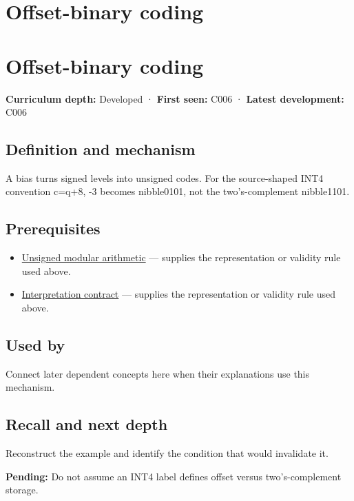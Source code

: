 \hypertarget{appendix-53a8cfb25f8d}{}
\section*{Offset-binary coding}
\section{Offset-binary coding}\label{offset-binary-coding}

\textbf{Curriculum depth:} Developed · \textbf{First seen:} C006 · \textbf{Latest development:} C006

\subsection{Definition and mechanism}\label{definition-and-mechanism}

A bias turns signed levels into unsigned codes. For the source-shaped INT4 convention c=q+8, -3 becomes nibble0101, not the two's-complement nibble1101.

\subsection{Prerequisites}\label{prerequisites}

\begin{itemize}
\tightlist
\item
  \hyperref[appendix-c99977d88b33]{Unsigned modular arithmetic} --- supplies the representation or validity rule used above.
\item
  \hyperref[appendix-f414bd4ed05c]{Interpretation contract} --- supplies the representation or validity rule used above.
\end{itemize}

\subsection{Used by}\label{used-by}

Connect later dependent concepts here when their explanations use this mechanism.

\subsection{Recall and next depth}\label{recall-and-next-depth}

Reconstruct the example and identify the condition that would invalidate it.

\textbf{Pending:} Do not assume an INT4 label defines offset versus two's-complement storage.

